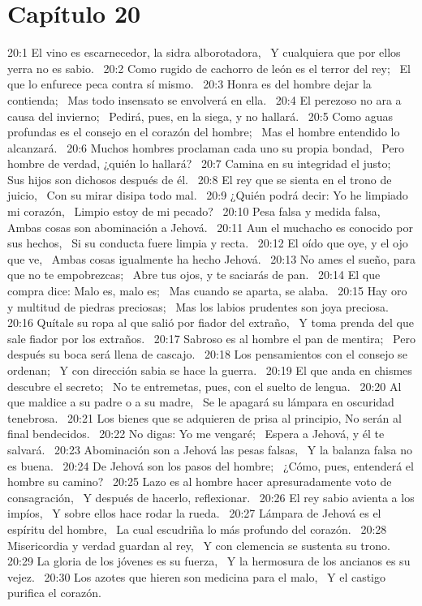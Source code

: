 \section*{Capítulo 20 }

20:1 El vino es escarnecedor, la sidra alborotadora,  
Y cualquiera que por ellos yerra no es sabio.  
20:2 Como rugido de cachorro de león es el terror del rey;  
El que lo enfurece peca contra sí mismo.  
20:3 Honra es del hombre dejar la contienda;  
Mas todo insensato se envolverá en ella.  
20:4 El perezoso no ara a causa del invierno;  
Pedirá, pues, en la siega, y no hallará.  
20:5 Como aguas profundas es el consejo en el corazón del hombre;  
Mas el hombre entendido lo alcanzará.  
20:6 Muchos hombres proclaman cada uno su propia bondad,  
Pero hombre de verdad, ¿quién lo hallará?  
20:7 Camina en su integridad el justo;  
Sus hijos son dichosos después de él.  
20:8 El rey que se sienta en el trono de juicio,  
Con su mirar disipa todo mal.  
20:9 ¿Quién podrá decir: Yo he limpiado mi corazón,  
Limpio estoy de mi pecado?  
20:10 Pesa falsa y medida falsa,  
Ambas cosas son abominación a Jehová.  
20:11 Aun el muchacho es conocido por sus hechos,  
Si su conducta fuere limpia y recta.  
20:12 El oído que oye, y el ojo que ve,  
Ambas cosas igualmente ha hecho Jehová.  
20:13 No ames el sueño, para que no te empobrezcas;  
Abre tus ojos, y te saciarás de pan.  
20:14 El que compra dice: Malo es, malo es;  
Mas cuando se aparta, se alaba.  
20:15 Hay oro y multitud de piedras preciosas;  
Mas los labios prudentes son joya preciosa.  
20:16 Quítale su ropa al que salió por fiador del extraño,  
Y toma prenda del que sale fiador por los extraños.  
20:17 Sabroso es al hombre el pan de mentira;  
Pero después su boca será llena de cascajo.  
20:18 Los pensamientos con el consejo se ordenan;  
Y con dirección sabia se hace la guerra.  
20:19 El que anda en chismes descubre el secreto;  
No te entremetas, pues, con el suelto de lengua.  
20:20 Al que maldice a su padre o a su madre,  
Se le apagará su lámpara en oscuridad tenebrosa.  
20:21 Los bienes que se adquieren de prisa al principio, 
No serán al final bendecidos.  
20:22 No digas: Yo me vengaré;  
Espera a Jehová, y él te salvará.  
20:23 Abominación son a Jehová las pesas falsas,  
Y la balanza falsa no es buena.  
20:24 De Jehová son los pasos del hombre;  
¿Cómo, pues, entenderá el hombre su camino?  
20:25 Lazo es al hombre hacer apresuradamente voto de consagración,  
Y después de hacerlo, reflexionar.  
20:26 El rey sabio avienta a los impíos,  
Y sobre ellos hace rodar la rueda.  
20:27 Lámpara de Jehová es el espíritu del hombre,  
La cual escudriña lo más profundo del corazón.  
20:28 Misericordia y verdad guardan al rey,  
Y con clemencia se sustenta su trono.  
20:29 La gloria de los jóvenes es su fuerza,  
Y la hermosura de los ancianos es su vejez.  
20:30 Los azotes que hieren son medicina para el malo,  
Y el castigo purifica el corazón.  
